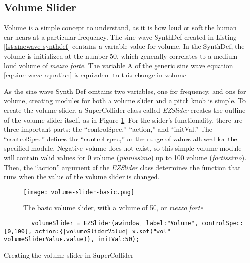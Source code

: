 \subsection{Volume Slider}

Volume is a simple concept to understand, as it is how loud or soft the human ear hears at a particular frequency. The sine wave SynthDef created in Listing \ref{lst:sinewave-synthdef} contains a variable value for volume. In the SynthDef, the volume is initialized at the number 50, which generally correlates to a medium-loud volume of \textit{mezzo forte}. The variable A of the generic sine wave equation \ref{eq:sine-wave-equation} is equivalent to this change in volume.

As the sine wave Synth Def contains two variables, one for frequency, and one for volume, creating modules for both a volume slider and a pitch knob is simple. To create the volume slider, a SuperCollider class called \textit{EZSlider} creates the outline of the volume slider itself, as in Figure \ref{fig:volume-slider-basic}. For the slider's functionality, there are three important parts: the ``controlSpec,'' ``action,'' and ``initVal.'' The ``controlSpec'' defines the ``control spec,'' or the range of values allowed for the specified module. Negative volume does not exist, so this simple volume module will contain valid values for 0 volume (\textit{pianissimo}) up to 100 volume (\textit{fortissimo}). Then, the ``action'' argument of the \textit{EZSlider} class determines the function that runs when the value of the volume slider is changed. 

\begin{figure}[h]
  \centering
  \texttt{[image: volume-slider-basic.png]}
  \caption{The basic volume slider, with a volume of 50, or \textit{mezzo forte}}
  \label{fig:volume-slider-basic}
\end{figure}

\begin{listing}
	\begin{lstlisting}
		volumeSlider = EZSlider(awindow, label:"Volume", controlSpec:[0,100], action:{|volumeSliderValue| x.set("vol", volumeSliderValue.value)}, initVal:50);
	\end{lstlisting}
	\caption{Creating the volume slider in SuperCollider}
	\label{lst:volume-slider-waveform}
\end{listing}

